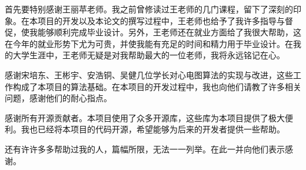 \begin{acknowledgement}

    首先要特别感谢王丽苹老师。我之前曾修读过王老师的几门课程，留下了深刻的印象。在本项目的开发以及本论文的撰写过程中，王老师也给予了我许多指导与督促，使我能够顺利完成毕业设计。另外，王老师还在就业方面给了我很大帮助，这在今年的就业形势下尤为可贵，并使我能有充足的时间和精力用于毕业设计。在我的大学生涯中，王老师无疑是对我帮助最大的一位老师，我将永远铭记在心。

    感谢宋培东、王彬宇、安浩铜、吴健几位学长对心电图算法的实现与改进，这些工作构成了本项目的算法基础。在本项目的开发过程中，我也向他们请教了许多相关问题，感谢他们的耐心指点。

    感谢所有开源贡献者。本项目使用了众多开源库，这些库为本项目提供了极大便利。我也已经将本项目的代码开源，希望能够为后来的开发者提供一些帮助。

    还有许许多多帮助过我的人，篇幅所限，无法一一列举。在此一并向他们表示感谢。

\end{acknowledgement}
